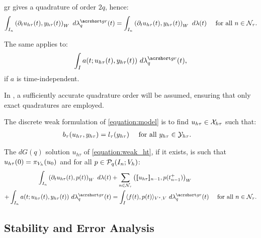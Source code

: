 \begin{remark}
    \acrshort{gr} gives a quadrature of order $2q$, hence:
    \begin{align}
        \int_{I_n} \left( \partial_t u_{h \tau}(t), y_{h \tau}(t) \right)_W ~ d \lambdaGR_q(t) &= \int_{I_n} \left( \partial_t u_{h \tau}(t), y_{h \tau}(t) \right)_W ~ d \lambda(t) &\text{ for all } n \in \TimeIndices.
    \end{align}
    
    The same applies to:
    \begin{align}
        \int_I a(t; u_{h \tau}(t), y_{h \tau}(t)) ~ d \lambdaGR_q(t),
    \end{align}
    if $a$ is time-independent.
\end{remark}
In , a sufficiently accurate quadrature order will be assumed, ensuring that only exact quadratures are employed.

\begin{definition}
    The discrete weak formulation of \cref{equation:model} is to find $u_{h \tau} \in \mathcal{X}_{h \tau}$ such that:
    \begin{align} \label{equation:weak_ht}
        b_{\tau}(u_{h \tau}, y_{h \tau}) &= l_{\tau}(y_{h \tau}) &\text{ for all } y_{h \tau} \in \mathcal{Y}_{h \tau}.
&    \end{align}
\end{definition}

\begin{proposition}[Localization]
    The $dG(q)$ solution $u_{h \tau}$ of \cref{equation:weak_ht}, if it exists, is such that $u_{h \tau}(0) = \pi_{V_h}(u_0)$ and for all $p \in \mathcal{P}_{q}(I_n; V_h)$:
    \begin{align}
        \int_{I_n} \left( \partial_t u_{h \tau}(t), p(t) \right)_W ~ d \lambda(t) & + \sum_{n \in \TimeIndices} \left( \llbracket u_{h \tau} \rrbracket_{n - 1}, p(t_{n - 1}^+) \right)_W \notag \\
        + \int_{I_n} a(t; u_{h \tau}(t), y_{h \tau}(t)) ~ d \lambdaGR_q(t) & = \int_I \langle f(t), p(t) \rangle_{V^*, V} ~ d \lambdaGR_q(t) &\text{ for all } n \in \TimeIndices.
    \end{align}
\end{proposition}

\newpage
\subsection{Stability and Error Analysis}

